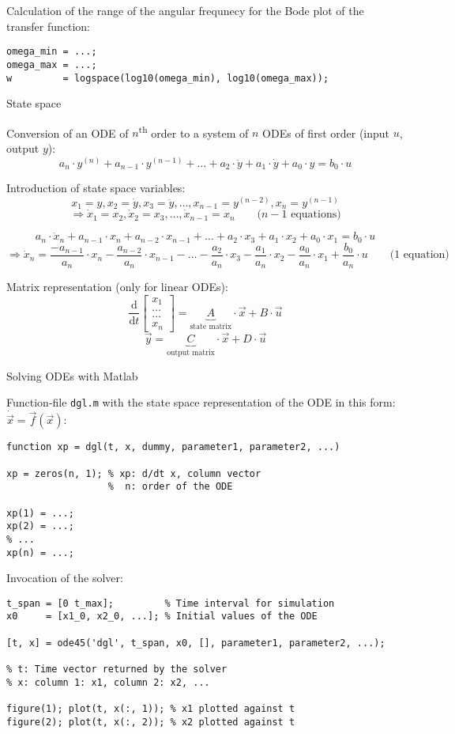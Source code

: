 \documentclass[a4paper,fontsize=11pt,parskip]{scrartcl}
\begin{document}
Calculation of the range of the angular frequnecy for the Bode plot of the transfer function:
\begin{lstlisting}
omega_min = ...;
omega_max = ...;
w         = logspace(log10(omega_min), log10(omega_max));
\end{lstlisting}

{\Large State space}

Conversion of an ODE of $n$\textsuperscript{th} order to a system of $n$ ODEs of first order (input $u$, output $y$):\\
\[a_n\cdot y^{(n)}+a_{n-1}\cdot y^{(n-1)}+\dots+a_2\cdot\ddot y+a_1\cdot\dot y+a_0\cdot y=b_0\cdot u\]

Introduction of state space variables:\\
\[x_1 = y, x_2 = \dot y, x_3 = \ddot y, \dots, x_{n-1} = y^{(n-2)}, x_n=y^{(n-1)}\]
\[\Rightarrow \dot x_1 = x_2, \dot x_2 = x_3, \dots, \dot x_{n-1} = x_n\qquad \text{(}n-1\text{ equations)}\]

\[a_n\cdot\dot x_n+a_{n-1}\cdot x_n+a_{n-2}\cdot x_{n-1}+\dots+a_2\cdot x_3+a_1\cdot x_2+a_0\cdot x_1=b_0\cdot u\]
\[\Rightarrow \dot x_n = \frac{-a_{n-1}}{a_n}\cdot x_n-\frac{a_{n-2}}{a_n}\cdot x_{n-1}-\dots-\frac{a_2}{a_n}\cdot x_3-\frac{a_1}{a_n}\cdot x_2-\frac{a_0}{a_n}\cdot x_1+\frac{b_0}{a_n}\cdot u\qquad \text{(1 equation)}\]

Matrix representation (only for linear ODEs):
\[\frac{\mathrm{d}}{\mathrm{d}t}\begin{bmatrix}x_1\\\dots\\\dots\\x_n\end{bmatrix}=\underbrace{A}_\text{state matrix}\cdot\vec x+B\cdot\vec u\]
\[\vec y=\underbrace{C}_\text{output matrix}\cdot\vec x+D\cdot\vec u\]

{\Large Solving ODEs with Matlab}

Function-file \texttt{dgl.m} with the state space representation of the ODE in this form: $\dot{\vec x}=\vec f(\vec x)$:
\begin{lstlisting}
function xp = dgl(t, x, dummy, parameter1, parameter2, ...)

xp = zeros(n, 1); % xp: d/dt x, column vector
                  %  n: order of the ODE

xp(1) = ...;
xp(2) = ...;
% ...
xp(n) = ...;
\end{lstlisting}

Invocation of the solver:
\begin{lstlisting}
t_span = [0 t_max];         % Time interval for simulation
x0     = [x1_0, x2_0, ...]; % Initial values of the ODE

[t, x] = ode45('dgl', t_span, x0, [], parameter1, parameter2, ...);

% t: Time vector returned by the solver
% x: column 1: x1, column 2: x2, ...

figure(1); plot(t, x(:, 1)); % x1 plotted against t
figure(2); plot(t, x(:, 2)); % x2 plotted against t
\end{lstlisting}
\end{document}
